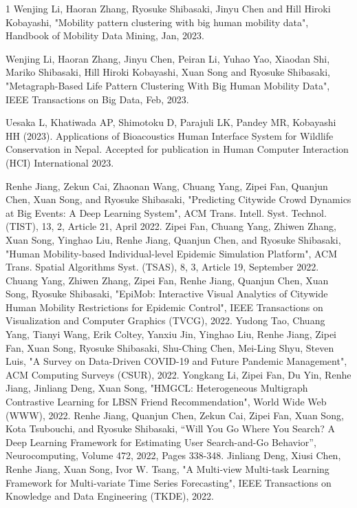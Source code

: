 \begin{雑誌論文}{1}
Wenjing Li, Haoran Zhang, Ryosuke Shibasaki,  Jinyu Chen and Hill Hiroki Kobayashi,  "Mobility pattern clustering with big human mobility data", Handbook of Mobility Data Mining, Jan, 2023.

Wenjing Li, Haoran Zhang, Jinyu Chen, Peiran Li, Yuhao Yao, Xiaodan Shi,  Mariko Shibasaki, Hill Hiroki Kobayashi, Xuan Song and Ryosuke Shibasaki,  "Metagraph-Based Life Pattern Clustering With Big Human Mobility Data", IEEE Transactions on Big Data, Feb, 2023.


Uesaka L, Khatiwada AP, Shimotoku D, Parajuli LK, Pandey MR, Kobayashi HH (2023). Applications of Bioacoustics Human Interface System for Wildlife Conservation in Nepal. Accepted for publication in Human Computer Interaction (HCI) International 2023.

Renhe Jiang, Zekun Cai, Zhaonan Wang, Chuang Yang, Zipei Fan, Quanjun Chen, Xuan Song, and Ryosuke Shibasaki, "Predicting Citywide Crowd Dynamics at Big Events: A Deep Learning System", ACM Trans. Intell. Syst. Technol. (TIST), 13, 2, Article 21, April 2022.
Zipei Fan, Chuang Yang, Zhiwen Zhang, Xuan Song, Yinghao Liu, Renhe Jiang, Quanjun Chen, and Ryosuke Shibasaki, "Human Mobility-based Individual-level Epidemic Simulation Platform", ACM Trans. Spatial Algorithms Syst. (TSAS), 8, 3, Article 19, September 2022.
Chuang Yang, Zhiwen Zhang, Zipei Fan, Renhe Jiang, Quanjun Chen, Xuan Song, Ryosuke Shibasaki, "EpiMob: Interactive Visual Analytics of Citywide Human Mobility Restrictions for Epidemic Control", IEEE Transactions on Visualization and Computer Graphics (TVCG), 2022.
Yudong Tao, Chuang Yang, Tianyi Wang, Erik Coltey, Yanxiu Jin, Yinghao Liu, Renhe Jiang, Zipei Fan, Xuan Song, Ryosuke Shibasaki, Shu-Ching Chen, Mei-Ling Shyu, Steven Luis, "A Survey on Data-Driven COVID-19 and Future Pandemic Management", ACM Computing Surveys (CSUR), 2022.
Yongkang Li, Zipei Fan, Du Yin, Renhe Jiang, Jinliang Deng, Xuan Song, "HMGCL: Heterogeneous Multigraph Contrastive Learning for LBSN Friend Recommendation", World Wide Web (WWW), 2022.
Renhe Jiang, Quanjun Chen, Zekun Cai, Zipei Fan, Xuan Song, Kota Tsubouchi, and Ryosuke Shibasaki, “Will You Go Where You Search? A Deep Learning Framework for Estimating User Search-and-Go Behavior”, Neurocomputing, Volume 472, 2022, Pages 338-348.
Jinliang Deng, Xiusi Chen, Renhe Jiang, Xuan Song, Ivor W. Tsang, "A Multi-view Multi-task Learning Framework for Multi-variate Time Series Forecasting", IEEE Transactions on Knowledge and Data Engineering (TKDE), 2022.


\end{雑誌論文}
